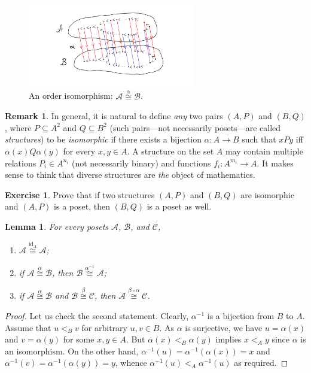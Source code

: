 \documentclass[12pt,notitlepage]{article}
\theoremstyle{plain}
\newtheorem{lemma}[thm]{Lemma}
\theoremstyle{definition}
\newtheorem{exc}[thm]{Exercise}
\newtheorem{rem}[thm]{Remark}
\theoremstyle{plain}
\newcommand{\sbs}{\subseteq}
\newcommand{\id}{\mathrm{id}}
\newcommand{\1}{\mathbf{1}}
\newcommand{\0}{\mathbf{0}}
\begin{document}
\begin{figure}[h]
\centering
\includegraphics*[width=0.65\textwidth]{ord_iso.pdf}
\caption{An order isomorphism: $\mathcal A \stackrel{\alpha}{\cong} \mathcal B$.}
\end{figure}

\begin{rem}
In general, it is natural to define \emph{any} two pairs $(A, P)$ and $(B, Q)$, where $P \sbs A^2$ and $Q \sbs B^2$ (such pairs---not necessarily posets---are called \emph{structures}) to be \emph{isomorphic} if there exists a bijection $\alpha\colon A \to B$ such that $x P y$ iff $\alpha(x) Q \alpha(y)$ for every $x, y \in A$. A structure on the set $A$ may contain multiple relations $P_i \in A^{n_i}$ (not necessarily binary) and functions $f_i \colon A^{m_i} \to A$. It makes sense to think that diverse structures are \emph{the} object of mathematics.
\end{rem}
\begin{exc}
Prove that if two structures $(A, P)$ and $(B, Q)$ are isomorphic and $(A, P)$ is a poset, then $(B, Q)$ is a poset as well.
\end{exc}

\begin{lemma}
For every posets  $\mathcal A$, $\mathcal B$, and $\mathcal C$,
\begin{enumerate}
\item $\mathcal A \stackrel{\id_A}{\cong}  \mathcal A$;
\item if $\mathcal A \stackrel{\alpha}{\cong}  \mathcal B$, then $\mathcal B \stackrel{\alpha^{-1}}{\cong}  \mathcal A$;
\item if $\mathcal A \stackrel{\alpha}{\cong}  \mathcal B$ and $\mathcal B \stackrel{\beta}{\cong}  \mathcal C$, then $\mathcal A \stackrel{\beta \circ \alpha}{\cong} \mathcal C$.
\end{enumerate}
\end{lemma}
\begin{proof}
Let us check the second statement. Clearly, $\alpha^{-1}$ is a bijection from $B$ to $A$. Assume that $u <_B v$ for arbitrary $u, v \in B$. As $\alpha$ is surjective, we have $u = \alpha(x)$ and $v = \alpha(y)$ for some $x, y \in A$. But $\alpha(x) <_B \alpha(y)$ implies $x <_A y$ since $\alpha$ is an isomorphism. On the other hand, $\alpha^{-1}(u) = \alpha^{-1}(\alpha(x)) = x$ and $\alpha^{-1}(v) = \alpha^{-1}(\alpha(y)) = y$, whence $\alpha^{-1}(u) <_A \alpha^{-1}(u)$ as required.
\end{proof}
\end{document}
